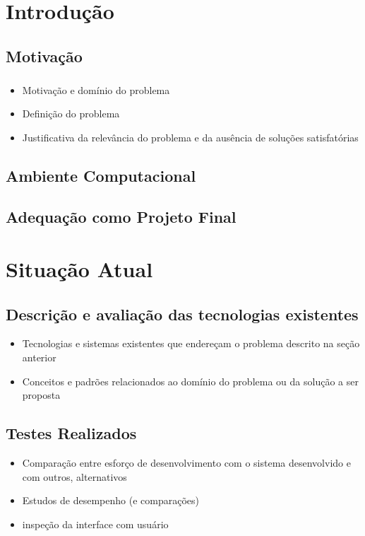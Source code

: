 \documentclass[
  dissertacao,
  brazil
]{ThesisPUC}
\begin{document}

\chapter{Introdução}
\section{Motivação}

\paragraph{}

\begin{itemize}
    \item Motivação e domínio do problema 
    \item Definição do problema
    \item Justificativa da relevância do problema e da ausência de soluções satisfatórias
\end{itemize}

\section{Ambiente Computacional}

\section{Adequação como Projeto Final}


\chapter{Situação Atual}

\section{Descrição e avaliação das tecnologias existentes}
\begin{itemize}
    \item Tecnologias e sistemas existentes que endereçam o problema descrito na seção anterior
    \item Conceitos e padrões relacionados ao domínio do problema ou da solução a ser proposta
\end{itemize}

\section{Testes Realizados}
\begin{itemize}
    \item Comparação entre esforço de desenvolvimento com o sistema desenvolvido e com outros, alternativos
    \item Estudos de desempenho (e comparações)
    \item inspeção da interface com usuário
\end{itemize}
\end{document}
